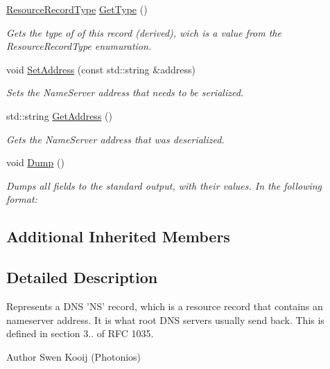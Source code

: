 \begin{DoxyCompactItemize}
\hyperlink{namespace_senergy_1_1_dns_a590bfd748c955364770f5ce358d9dfe0}{Resource\-Record\-Type} \hyperlink{class_senergy_1_1_dns_1_1_name_server_record_a2ad5b053bceedbf8bf927a275d530431}{Get\-Type} ()
\begin{DoxyCompactList}\small\item\em Gets the type of of this record (derived), wich is a value from the Resource\-Record\-Type enumuration. \end{DoxyCompactList}\item 
void \hyperlink{class_senergy_1_1_dns_1_1_name_server_record_a013b114dfa28ff37eb3f1a3c24390646}{Set\-Address} (const std\-::string \&address)
\begin{DoxyCompactList}\small\item\em Sets the Name\-Server address that needs to be serialized. \end{DoxyCompactList}\item 
std\-::string \hyperlink{class_senergy_1_1_dns_1_1_name_server_record_a012e369dd4a94c98cb01e6df87ea8cbc}{Get\-Address} ()
\begin{DoxyCompactList}\small\item\em Gets the Name\-Server address that was deserialized. \end{DoxyCompactList}\item 
void \hyperlink{class_senergy_1_1_dns_1_1_name_server_record_a95047855d9e9fb77fbbfa8534c3ddb62}{Dump} ()
\begin{DoxyCompactList}\small\item\em Dumps all fields to the standard output, with their values. In the following format\-: \end{DoxyCompactList}\end{DoxyCompactItemize}
\subsection*{Additional Inherited Members}


\subsection{Detailed Description}
Represents a D\-N\-S 'N\-S' record, which is a resource record that contains an nameserver address. It is what root D\-N\-S servers usually send back. This is defined in section 3.. of R\-F\-C 1035. 

\begin{DoxyAuthor}{Author}
Swen Kooij (Photonios) 
\end{DoxyAuthor}


